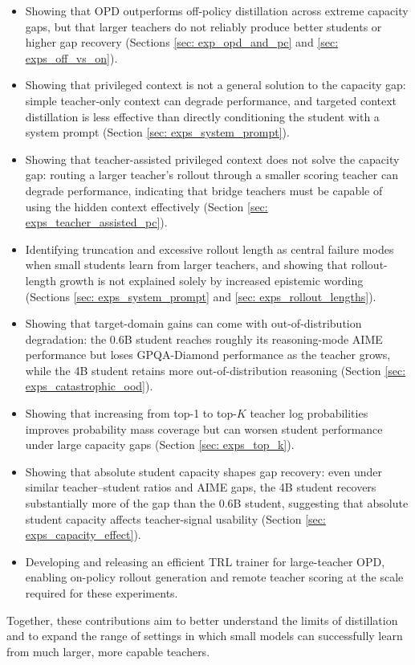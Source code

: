 \begin{itemize}
    \item Showing that OPD outperforms off-policy distillation across extreme capacity gaps, but that larger teachers do not reliably produce better students or higher gap recovery (Sections \ref{sec: exp_opd_and_pc} and \ref{sec: exps_off_vs_on}).
    \item Showing that privileged context is not a general solution to the capacity gap: simple teacher-only context can degrade performance, and targeted context distillation is less effective than directly conditioning the student with a system prompt (Section \ref{sec: exps_system_prompt}).
    \item Showing that teacher-assisted privileged context does not solve the capacity gap: routing a larger teacher's rollout through a smaller scoring teacher can degrade performance, indicating that bridge teachers must be capable of using the hidden context effectively (Section \ref{sec: exps_teacher_assisted_pc}).
    \item Identifying truncation and excessive rollout length as central failure modes when small students learn from larger teachers, and showing that rollout-length growth is not explained solely by increased epistemic wording (Sections \ref{sec: exps_system_prompt} and \ref{sec: exps_rollout_lengths}).
    \item Showing that target-domain gains can come with out-of-distribution degradation: the 0.6B student reaches roughly its reasoning-mode AIME performance but loses GPQA-Diamond performance as the teacher grows, while the 4B student retains more out-of-distribution reasoning (Section \ref{sec: exps_catastrophic_ood}).
    \item Showing that increasing from top-1 to top-$K$ teacher log probabilities improves probability mass coverage but can worsen student performance under large capacity gaps (Section \ref{sec: exps_top_k}).
    \item Showing that absolute student capacity shapes gap recovery: even under similar teacher--student ratios and AIME gaps, the 4B student recovers substantially more of the gap than the 0.6B student, suggesting that absolute student capacity affects teacher-signal usability (Section \ref{sec: exps_capacity_effect}).
    \item Developing and releasing an efficient TRL trainer for large-teacher OPD, enabling on-policy rollout generation and remote teacher scoring at the scale required for these experiments.
\end{itemize}

Together, these contributions aim to better understand the limits of distillation and to expand the range of settings in which small models can successfully learn from much larger, more capable teachers.
